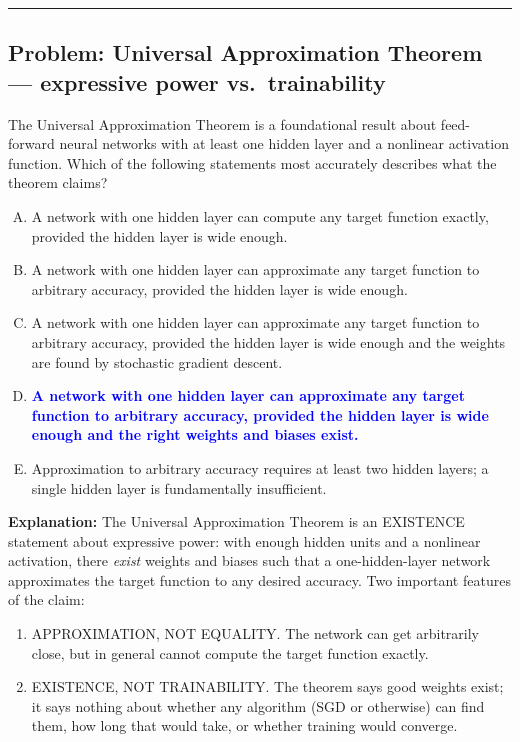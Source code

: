 \documentclass[12pt]{amsart}
\newcommand{\divider}{
  \vspace{-1em}
  \noindent
  \raisebox{-0.15ex}{\textbullet}%
  \hspace{0.5em}%
  \rule[0.5ex]{0.95\textwidth}{1.0pt}%
  \hspace{0.5em}%
  \raisebox{-0.15ex}{\textbullet}%
  \vspace{0em}
}
\begin{document}
\divider

\subsection*{Problem: Universal Approximation Theorem --- expressive power vs.\ trainability}

The Universal Approximation Theorem is a foundational result about feed-forward
neural networks with at least one hidden layer and a nonlinear activation
function. Which of the following statements most accurately describes what
the theorem claims?

\begin{enumerate}[(A)]
\item A network with one hidden layer can compute any target function exactly,
provided the hidden layer is wide enough.
\item A network with one hidden layer can approximate any target function to
arbitrary accuracy, provided the hidden layer is wide enough.
\item A network with one hidden layer can approximate any target function to
arbitrary accuracy, provided the hidden layer is wide enough and the weights
are found by stochastic gradient descent.
\item \textcolor{blue}{\textbf{A network with one hidden layer can approximate any target function to arbitrary accuracy, provided the hidden layer is wide enough and the right weights and biases exist.}}
\item Approximation to arbitrary accuracy requires at least two hidden layers;
a single hidden layer is fundamentally insufficient.
\end{enumerate}

\textbf{Explanation:}
The Universal Approximation Theorem is an EXISTENCE statement about expressive
power: with enough hidden units and a nonlinear activation, there \emph{exist}
weights and biases such that a one-hidden-layer network approximates the target
function to any desired accuracy. Two important features of the claim:
\begin{enumerate}[(1)]
\item APPROXIMATION, NOT EQUALITY. The network can get arbitrarily close, but
in general cannot compute the target function exactly.
\item EXISTENCE, NOT TRAINABILITY. The theorem says good weights exist; it says
nothing about whether any algorithm (SGD or otherwise) can find them, how
long that would take, or whether training would converge.
\end{enumerate}
\end{document}
